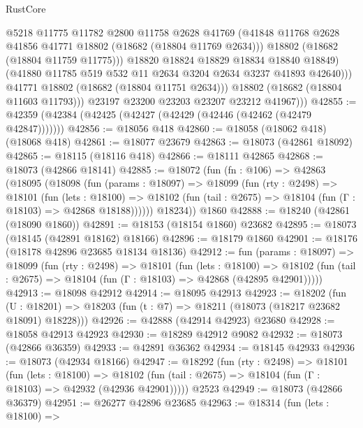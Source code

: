 \begin{lexlean}{RustCore}
\begin{coremodule}
                      @5218
                      @11775
                      @11782
                      @2800
                      @11758
                      @2628
                      @41769
                      (@41848 @11768 @2628 @41856 @41771 @18802 (@18682 (@18804 @11769 @2634)))
                      @18802
                      (@18682 (@18804 @11759 @11775)))
                    @18820
                    @18824
                    @18829
                    @18834
                    @18840
                    @18849)
                  (@41880 @11785 @519 @532 @11 @2634 @3204 @2634 @3237 @41893 @42640)))
              @41771
              @18802
              (@18682 (@18804 @11751 @2634)))
            @18802
            (@18682 (@18804 @11603 @11793)))
          @23197
          @23200
          @23203
          @23207
          @23212
          @41967)))
@42855 := @42359 (@42384 (@42425 (@42427 (@42429 (@42446 (@42462 (@42479 @42847)))))))
@42856 := @18056 @418
@42860 := @18058 (@18062 @418) (@18068 @418)
@42861 := @18077 @23679
@42863 := @18073 (@42861 @18092)
@42865 := @18115 (@18116 @418)
@42866 := @18111 @42865
@42868 := @18073 (@42866 @18141)
@42885 := @18072
    (fun (fn : @106) =>
    @42863
      (@18095
        (@18098
          (fun (params : @18097) =>
          @18099
            (fun (rty : @2498) =>
            @18101
              (fun (lets : @18100) =>
              @18102 (fun (tail : @2675) => @18104 (fun (Γ : @18103) => @42868 @18188))))))
        @18234))
    @1860
@42888 := @18240 (@42861 (@18090 @1860))
@42891 := @18153 (@18154 @1860) @23682
@42895 := @18073 (@18145 (@42891 @18162) @18166)
@42896 := @18179 @1860
@42901 := @18176 (@18178 @42896 @23685 @18134 @18136)
@42912 := fun (params : @18097) =>
  @18099
    (fun (rty : @2498) =>
    @18101
      (fun (lets : @18100) =>
      @18102 (fun (tail : @2675) => @18104 (fun (Γ : @18103) => @42868 (@42895 @42901)))))
@42913 := @18098 @42912
@42914 := @18095 @42913
@42923 := @18202
    (fun (U : @18201) => @18203 (fun (t : @7) => @18211 (@18073 (@18217 @23682 @18091) @18228)))
@42926 := @42888 (@42914 @42923) @23680
@42928 := @18058 @42913 @42923
@42930 := @18289 @42912 @9082
@42932 := @18073 (@42866 @36359)
@42933 := @42891 @36362
@42934 := @18145 @42933
@42936 := @18073 (@42934 @18166)
@42947 := @18292
    (fun (rty : @2498) =>
    @18101
      (fun (lets : @18100) =>
      @18102 (fun (tail : @2675) => @18104 (fun (Γ : @18103) => @42932 (@42936 @42901)))))
    @2523
@42949 := @18073 (@42866 @36379)
@42951 := @26277 @42896 @23685
@42963 := @18314
    (fun (lets : @18100) =>

\end{coremodule}
\end{lexlean}
